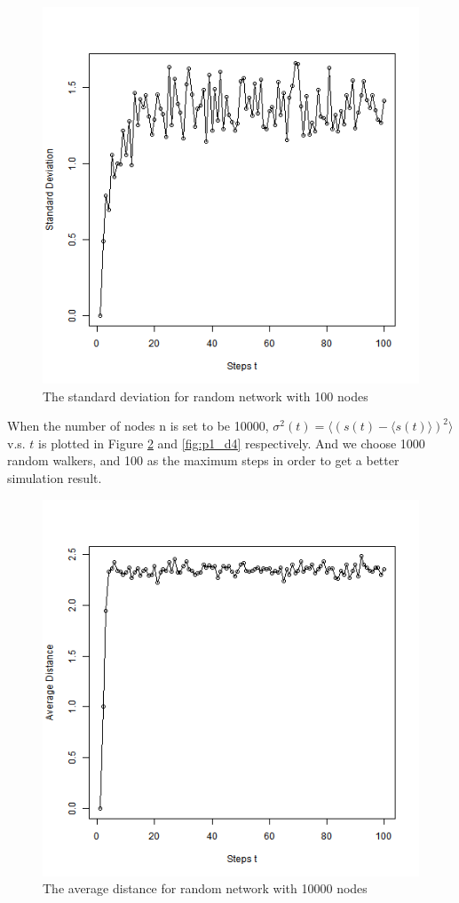 \documentclass{article}
\begin{document}
\begin{figure}[htbp]
\centering
\includegraphics[width=.6\textwidth]{Q1d_2_100.png}
\caption{The standard deviation for random network with 100 nodes}
\label{fig:p1_d2}
\end{figure}
\noindent When the number of nodes n is set to be 10000, $\sigma^2(t)=\langle (s(t)-\langle s(t)\rangle)^2\rangle$ v.s. $t$ is plotted in Figure \ref{fig:p1_d3} and \ref{fig:p1_d4} respectively. And we choose 1000 random walkers, and 100 as the maximum steps in order to get a better simulation result.
\begin{figure}[htbp]
\centering
\includegraphics[width=.6\textwidth]{Q1d_1_10000.png}
\caption{The average distance for random network with 10000 nodes}
\label{fig:p1_d3}
\end{figure}\\
\\
\end{document}
